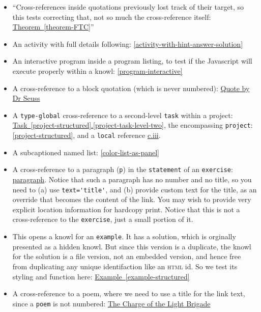 \documentclass[10pt,]{article}
\newcommand{\initialism}[1]{\textsc{\MakeLowercase{#1}}}
\theoremstyle{plain}
\theoremstyle{definition}
\theoremstyle{definition}
\theoremstyle{definition}
\theoremstyle{definition}
\theoremstyle{definition}
\theoremstyle{definition}
\numberwithin{equation}{section}
\begin{document}
\begin{itemize}[label=\textbullet]
\item{}\hypertarget{p-567}{}%
``Cross-references inside quotations previously lost track of their target, so this tests correcting that, not so much the cross-reference itself: \hyperref[theorem-FTC]{Theorem~\ref{theorem-FTC}}''%
\item{}\hypertarget{p-568}{}%
An activity with full details following: \hyperref[activity-with-hint-answer-solution]{\ref{activity-with-hint-answer-solution}}%
\item{}\hypertarget{p-569}{}%
An interactive program inside a program listing, to test if the Javascript will execute properly within a knowl: \hyperref[program-interactive]{\ref{program-interactive}}%
\item{}\hypertarget{p-570}{}%
A cross-reference to a block quotation (which is never numbered): \hyperlink{blockquote-seuss}{Quote by Dr Seuss}%
\item{}\hypertarget{p-571}{}%
A \lstinline?type-global? cross-reference to a second-level \lstinline?task? within a project: \hyperref[project-task-level-two]{Task~\ref{project-structured}.\ref{project-task-level-two}}, the encompassing \lstinline?project?: \hyperref[project-structured]{\ref{project-structured}}, and a \lstinline?local? reference \hyperref[project-task-level-two]{c.iii}.%
\item{}\hypertarget{p-572}{}%
A subcaptioned named list: \hyperref[color-list-as-panel]{\ref{color-list-as-panel}}%
\item{}\hypertarget{p-573}{}%
A cross-reference to a paragraph (\lstinline?p?) in the \lstinline?statement? of an \lstinline?exercise?: \hyperlink{paragraph-in-exercise}{paragraph}.  Notice that such a paragraph has no number and no title, so you need to (a) use \lstinline?text='title'?, and (b) provide custom text for the title, as an override that becomes the content of the link.  You may wish to provide very explicit location information for hardcopy print.  Notice that this is not a cross-reference to the \lstinline?exercise?, just a small portion of it.%
\item{}\hypertarget{p-574}{}%
This opens a knowl for an \lstinline?example?.  It has a solution, which is orginally presented as a hidden knowl.  But since this version is a duplicate, the knowl for the solution is a file version, not an embedded version, and hence free from duplicating any unique identifaction like an \initialism{HTML} id.  So we test its styling and function here: \hyperref[example-structured]{Example~\ref{example-structured}}%
\item{}\hypertarget{p-575}{}%
A cross-reference to a poem, where we need to use a title for the link text, since a \lstinline?poem? is not numbered: \hyperref[poem-light-brigade]{The Charge of the Light Brigade}%
\end{itemize}
\end{document}
